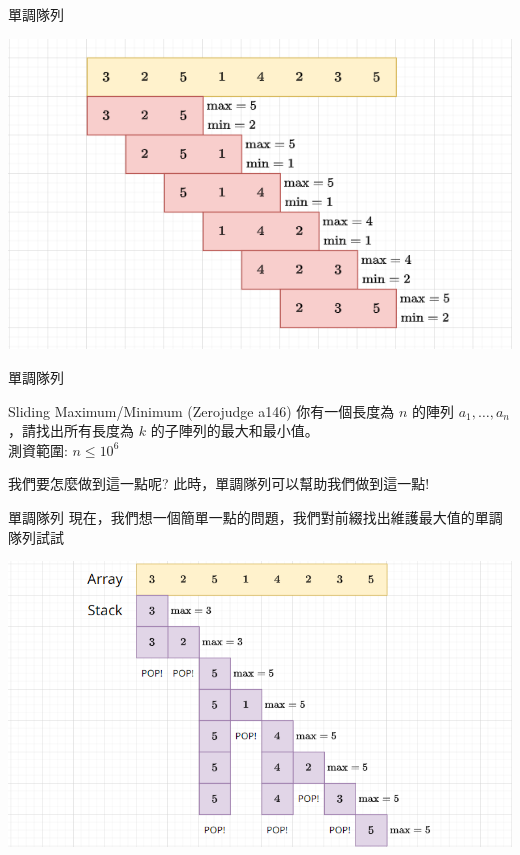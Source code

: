 \documentclass[aspectratio=169]{beamer}
\begin{document}
\begin{frame}[fragile]{單調隊列}
    \begin{center}
        \includegraphics[scale=0.7]{images/sliding_max_min.png}
    \end{center}
\end{frame}

\begin{frame}[fragile]{單調隊列}
    \begin{block}{Sliding Maximum/Minimum (Zerojudge a146)}
        你有一個長度為 $n$ 的陣列 $a_1, \dots, a_n$，請找出所有長度為 $k$ 的子陣列的最大和最小值。 \\
        \vspace{5mm}
        測資範圍: $n \le 10^6$
    \end{block}
    
    我們要怎麼做到這一點呢? 此時，單調隊列可以幫助我們做到這一點!
\end{frame}

\begin{frame}[fragile]{單調隊列}
    現在，我們想一個簡單一點的問題，我們對前綴找出維護最大值的單調隊列試試
    \begin{center}
        \includegraphics[scale=0.45]{images/prefix_max.png}
    \end{center}
\end{frame}
\end{document}
